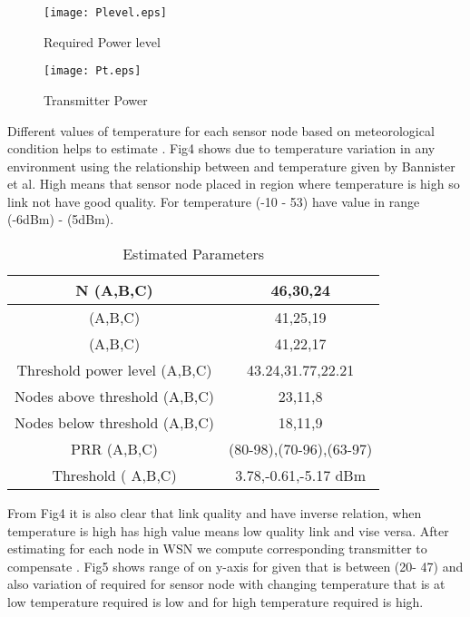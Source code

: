 \documentclass[12pt, conference, compsocconf, onecolumn, draftcls]{IEEEtran}
\begin{document}
\begin{figure}[h]
\begin{center}
\texttt{[image: Plevel.eps]}
\caption{Required Power level}
\end{center}
\end{figure}

\begin{figure}[h]
\begin{center}
\texttt{[image: Pt.eps]}
\caption{Transmitter Power}
\end{center}
\end{figure}

Different values of temperature for each sensor node based on meteorological condition  helps to estimate . Fig4 shows  due to temperature variation in any environment using the relationship between  and temperature  given by Bannister et al.  High   means that sensor node  placed in region where temperature is high so link not have good quality. For temperature (-10 - 53)   have value in range (-6dBm) - (5dBm).

\begin{table}[h!]
  \centering
  \caption{Estimated Parameters}
  \tiny
  \begin{tabular}{|c|c|}\hline
    N (A,B,C)   & 46,30,24 \\ \hline
      (A,B,C)   & 41,25,19 \\ \hline
     (A,B,C) & 41,22,17 \\ \hline
    Threshold power level (A,B,C)  & 43.24,31.77,22.21 \\ \hline
    Nodes above threshold  (A,B,C)  & 23,11,8 \\ \hline
    Nodes below threshold  (A,B,C)   & 18,11,9 \\ \hline
    PRR (A,B,C) & (80-98),(70-96),(63-97)  \\ \hline
    Threshold  ( A,B,C) & 3.78,-0.61,-5.17 dBm \\\hline
    \end{tabular}\label{tab:addlabel}\end{table}
From Fig4 it is also clear that link quality and  have inverse relation, when temperature is high  has high value means low quality link and vise versa. After estimating  for each node in WSN we compute corresponding transmitter  to compensate .  Fig5 shows range of  on y-axis for given  that is between (20- 47) and also variation of required  for sensor node with changing temperature that is at low temperature required  is low and for high temperature required  is high.
\end{document}
